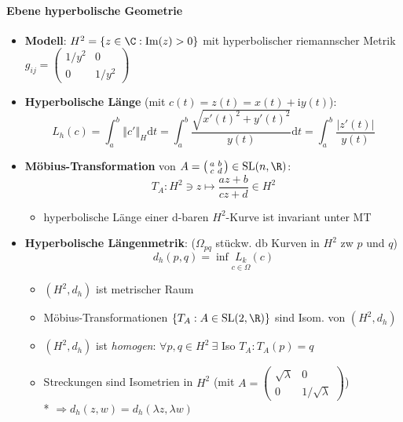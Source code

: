 \paragraph{Ebene hyperbolische Geometrie}
\begin{itemize}
  \item \textbf{Modell}: \( H^2 = \left \{ z \in \C : \text{Im}(z) > 0 \right \} \) mit hyperbolischer riemannscher Metrik \( g_{ij} = \left( \begin{smallmatrix}
    1/y^2 & 0 \\ 0 & 1/y^2
  \end{smallmatrix} \right) \)
  \item \textbf{Hyperbolische Länge} (mit \( c(t) = z(t) = x(t) + \text{i}y(t) \)):
  \begin{equation*}
    L_h(c) = \int_a^b \left\Vert c' \right\Vert_H \text{d}t = \int_a^b \frac{\sqrt{x'{(t)}^2+y'{(t)}^2}}{y(t)} \text{d}t = \int_a^b \frac{\left\vert z'(t) \right\vert}{y(t)}
  \end{equation*}
  \item \textbf{Möbius-Transformation} von \( A = \left( \begin{smallmatrix}
    a & b \\ c & d
  \end{smallmatrix} \right) \in \text{SL}(n,\R) \):
  \begin{equation*}
    T_A : H^2 \ni z \mapsto \frac{az+b}{cz+d} \in H^2
  \end{equation*}
  \begin{itemize}
    \item hyperbolische Länge einer d-baren \( H^2 \)-Kurve ist invariant unter MT
  \end{itemize}
  \item \textbf{Hyperbolische Längenmetrik}: (\( \Omega_{pq} \) stückw. db Kurven in \( H^2 \) zw \( p \) und \( q \))
  \begin{equation*}
    d_h(p,q) = \inf \underset{c \in \Omega}{L_k}(c)
  \end{equation*}
  \begin{itemize}
    \item \( (H^2, d_h) \) ist metrischer Raum
    \item Möbius-Transformationen \( \left \{ T_A : A \in \text{SL}(2,\R) \right \} \) sind Isom. von \( (H^2, d_h) \)
    \item \( (H^2, d_h) \) ist \emph{homogen}: \( \forall p,q \in H^2 \ \exists \) Iso \( T_A : T_A(p) = q \)
    \item Streckungen sind Isometrien in \( H^2 \) (mit \( A = \left( \begin{smallmatrix}
      \sqrt{\lambda} & 0 \\ 0 & 1/\sqrt{\lambda}
    \end{smallmatrix} \right) \)) \\*
    \( \Rightarrow d_h(z,w) = d_h(\lambda z, \lambda w) \)
  \end{itemize}
\end{itemize}

